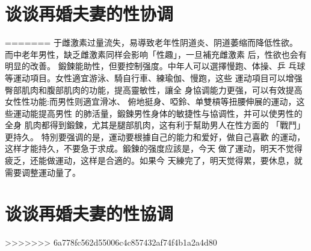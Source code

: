 \documentclass[12pt,UTF8]{ctexbook}
\begin{document}
\section{谈谈再婚夫妻的性协调}
=======
于雌激素过量流失，易導致老年性阴道炎、阴道萎缩而降低性欲。
而中老年男性，缺乏雌激素同样会影响「性趣」，一旦補充雌激素
后，性欲也会有明显的改善。
鍛鍊能助性，但要控制强度。中年人可以選擇慢跑、体操、乒
乓球等運动項目。女性適宜游泳、騎自行車、練瑜伽、慢跑，这些
運动項目可以增强臀部肌肉和腹部肌肉的功能，提高靈敏性，讓全
身協调能力更强，可以有效提高女性性功能:而男性则適宜滑冰、
俯地挺身、啞鈴、单雙槓等扭腰伸展的運动，这些運动能提高男性
的肺活量，鍛鍊男性身体的敏捷性与協调性，并可以使男性的全身
肌肉都得到鍛鍊，尤其是腿部肌肉，这有利于幫助男人在性方面的
「戰鬥」更持久。
特別要强调的是，運动要根據自己的能力和爱好，做自己喜歡
的運动，这样才能持久，不要急于求成。鍛鍊的强度应該是，今天
做了運动，明天不觉得疲乏，还能做運动，这样是合適的。如果今
天練完了，明天觉得累，要休息，就需要调整運动量了。

\section{谈谈再婚夫妻的性協调}
>>>>>>> 6a778fc562d55006c4c857432af74f4b1a2a4d80
\end{document}
